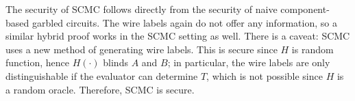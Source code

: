 The security of SCMC follows directly from the security of naive component-based garbled circuits. 
The wire labels again do not offer any information, so a similar hybrid proof works in the SCMC setting as well. 
There is a caveat: SCMC uses a new method of generating wire labels. 
This is secure since $H$ is random function, hence $H(\cdot)$ blinds $A$ and $B$; in particular, the wire labels are only distinguishable if the evaluator can determine $T$, which is not possible since $H$ is a random oracle.
Therefore, SCMC is secure. 
































